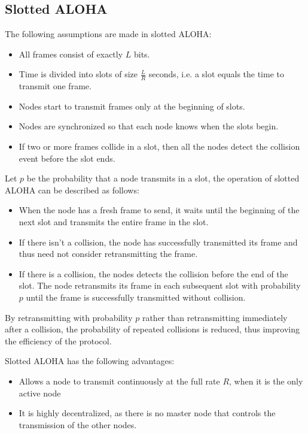 \documentclass[12pt letter]{report}
\begin{document}
\subsection{Slotted ALOHA}

The following assumptions are made in slotted ALOHA:
\begin{itemize}
  \item All frames consist of exactly $L$ bits.
  \item Time is divided into slots of size $\frac{L}{R}$ seconds, i.e.
    a slot equals the time to transmit one frame.
  \item  Nodes start to transmit frames only at the beginning of slots.
  \item Nodes are synchronized so that each node knows when the slots begin.
  \item If two or more frames collide in a slot, then all the nodes
    detect the collision event before the slot ends.
\end{itemize}

Let $p$ be the probability that a node transmits in a slot, the
operation of slotted ALOHA can be described as follows:
\begin{itemize}
  \item When the node has a fresh frame to send, it waits until the
    beginning of the next slot and transmits the entire frame in the slot.
  \item If there isn't a collision, the node has successfully
    transmitted its frame and thus need not consider retransmitting the frame.
  \item If there is a collision, the nodes detects the collision
    before the end of the slot. The node retransmits its frame in
    each subsequent slot with probability $p$ until the frame is
    successfully transmitted without collision.
\end{itemize}

By retransmitting with probability $p$ rather than retransmitting
immediately after a collision, the probability of repeated collisions
is reduced, thus improving the efficiency of the protocol.

Slotted ALOHA has the following advantages:
\begin{itemize}
  \item Allows a node to transmit continuously at the full rate $R$,
    when it is the only active node
  \item  It is highly decentralized, as there is no master node that
    controls the
    transmission of the other nodes.
\end{itemize}
\end{document}
